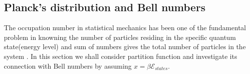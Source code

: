 \documentclass[pdflatex,sn-mathphys-num]{sn-jnl}%
\newtheorem{theorem}{Theorem}
\theoremstyle{thmstyleone}%
\theoremstyle{thmstyletwo}%
\theoremstyle{thmstylethree}%
\begin{document}









\subsection{Planck's distribution and Bell numbers}
The occupation number in statistical mechanics has been one of the fundamental problem in knowning the number of particles residing in the specific quantum state(energy level) and sum of numbers gives the total number of particles in the system \cite{zhou2018canonical, shinde2025large, dai2004gentile, gentile1940itosservazioni, katsura1970intermediate}. In this section we shall consider partition function and investigate its connection with Bell numbers by assuming $x=\beta\mathcal{E}_{states}. $
\end{document}
